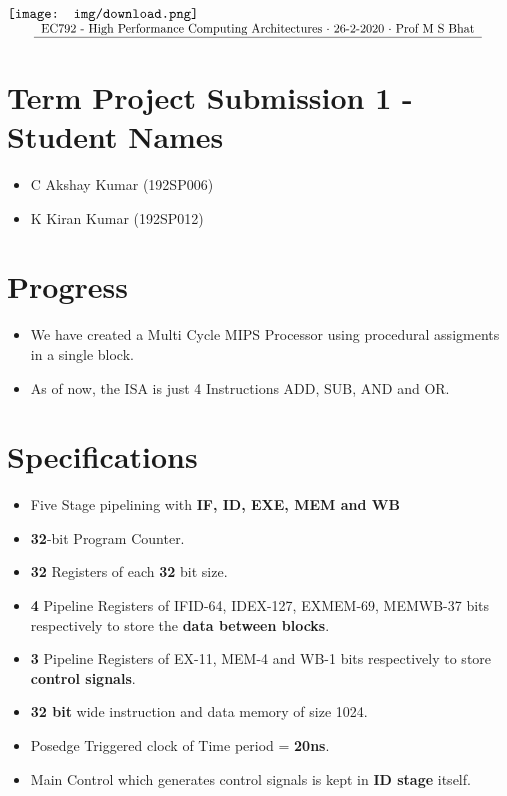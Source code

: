 \documentclass{article}
\begin{document}
\begin{frame}{}
    \centering
    \hspace*{-0.5cm}
    $\vcenter{\hbox{\texttt{[image: img/download.png]}}}$
    $\vcenter{\resizebox{0.95\textwidth}{!}{
        \begin{tabular}{c}
             EC792 - High Performance Computing Architectures $\cdot$ 26-2-2020 $\cdot$ Prof M S Bhat  \\
             \hline 
        \end{tabular}
    }}$
\end{frame}

\section*{Term Project Submission 1 - Student Names}

\begin{itemize}
    \item C Akshay Kumar (192SP006)
    \item K Kiran Kumar (192SP012)
\end{itemize}

\section*{Progress}

\begin{itemize}
    \item We have created a Multi Cycle MIPS Processor using procedural assigments in a single block.
    \item As of now, the ISA is just 4 Instructions ADD, SUB, AND and OR.
    
\end{itemize}

\section*{Specifications}

\begin{itemize}
    \item Five Stage pipelining with \textbf{IF, ID, EXE, MEM and WB}
    \item \textbf{32}-bit Program Counter.
    \item \textbf{32} Registers of each \textbf{32} bit size.
    \item \textbf{4} Pipeline Registers of IFID-64, IDEX-127, EXMEM-69, MEMWB-37 bits respectively to store the \textbf{data between blocks}.
    \item \textbf{3} Pipeline Registers of EX-11, MEM-4 and WB-1 bits respectively to store \textbf{control signals}.
    \item \textbf{32 bit} wide instruction and data memory of size 1024.
    \item Posedge Triggered clock of Time period = \textbf{20ns}.
    \item Main Control which generates control signals is kept in \textbf{ID stage }itself.
    
\end{itemize}
\end{document}
